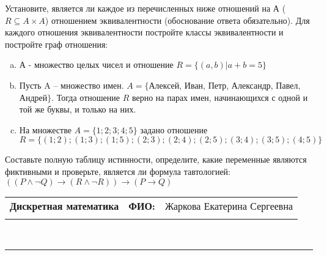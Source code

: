 \documentclass[10pt]{exam}
\newcommand{\class}{Дискретная математика}
\newcommand{\examdate}{}
\begin{document}
\begin{questions}
\question
Установите, является ли каждое из перечисленных ниже отношений на А ($R \subseteq A \times A$) отношением эквивалентности (обоснование ответа обязательно). Для каждого отношения эквивалентности постройте классы 
эквивалентности и постройте граф отношения:
\begin{enumerate} [a)]\setcounter{enumi}{0}
\item А - множество целых чисел и отношение $R = \{(a,b)|a + b = 5\}$
\item Пусть A – множество имен. $A = \{ $Алексей, Иван, Петр, Александр, Павел, Андрей$ \}$. Тогда отношение $R $ верно на парах имен, начинающихся с одной и той же буквы, и только на них.
\item На множестве $A = \{1; 2; 3; 4; 5\}$ задано отношение $R = \{(1; 2); (1; 3); (1; 5); (2; 3); (2; 4); (2; 5); (3; 4); (3; 5); (4; 5)\}$
\end{enumerate}\question Составьте полную таблицу истинности, определите, какие переменные являются фиктивными и проверьте, является ли формула тавтологией:
$(( P \land \neg Q) \rightarrow (R \land \neg R)) \rightarrow (P \rightarrow Q)$

\end{questions}
\newpage
\begin{flushright}
\begin{tabular}{p{2.8in} r l}
\textbf{\class} & \textbf{ФИО:} &Жаркова Екатерина Сергеевна
\\

\textbf{\examdate} &&\\
\end{tabular}\\
\end{flushright}
\rule[1ex]{\textwidth}{.1pt}
\end{document}
